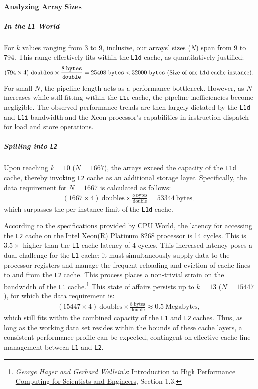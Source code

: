 \documentclass{article}
\begin{document}
\paragraph*{Analyzing Array Sizes}
\subparagraph*{In the \texttt{L1} World}
\noindent For $k$ values ranging from 3 to 9, inclusive, our arrays' sizes (\(N\)) span from 9 to 794. This range effectively fits within the \texttt{L1d} cache, as quantitatively justified:
\begin{align*}
    (794 \times 4)\ \texttt{doubles} \times \frac{8\ \texttt{bytes}}{\texttt{double}} = 25408\ \texttt{bytes} < 32000\ \texttt{bytes}\ (\text{Size of one \texttt{L1d} cache instance}).
\end{align*}
For small \(N\), the pipeline length acts as a performance bottleneck. However, as \(N\) increases while still fitting within the \texttt{L1d} cache, the pipeline inefficiencies become negligible. 
The observed performance trends are then largely dictated by the \texttt{L1d} and \texttt{L1i} bandwidth and the Xeon processor's capabilities in instruction dispatch for load and store operations.

\subparagraph*{Spilling into \texttt{L2}}
Upon reaching \( k = 10 \) (\( N = 1667 \)), the arrays exceed the capacity of the \texttt{L1d} cache, thereby invoking \texttt{L2} cache as an additional storage layer. Specifically, the data requirement for \( N = 1667 \) is calculated as follows:
\begin{align*}
    (1667 \times 4)\ \text{doubles} \times \frac{8\ \text{bytes}}{\text{double}} = 53344\ \text{bytes},
\end{align*}
which surpasses the per-instance limit of the \texttt{L1d} cache.

According to the specifications provided by CPU World, the latency for accessing the \texttt{L2} cache on the Intel Xeon(R) Platinum 8268 processor is 14 cycles. This is \( 3.5 \times \) higher than the \texttt{L1} cache latency of 4 cycles.
This increased latency poses a dual challenge for the \texttt{L1} cache: it must simultaneously supply data to the processor registers and manage the frequent reloading and eviction of cache lines to and from the \texttt{L2} cache. This process places a non-trivial strain on the bandwidth of the \texttt{L1} cache.\footnote{\textit{George Hager and Gerhard Wellein's}: \underline{Introduction to High Performance Computing for Scientists and Engineers}, Section 1.3.}
This state of affairs persists up to \( k = 13 \) (\( N = 15447 \)), for which the data requirement is:
\begin{align*}
    (15447 \times 4)\ \text{doubles} \times \frac{8\ \text{bytes}}{\text{double}} \approx 0.5\ \text{Megabytes},
\end{align*}
which still fits within the combined capacity of the \texttt{L1} and \texttt{L2} caches. Thus, as long as the working data set resides within the bounds of these cache layers, a consistent performance profile can be expected, contingent on effective cache line management between \texttt{L1} and \texttt{L2}.
\end{document}
